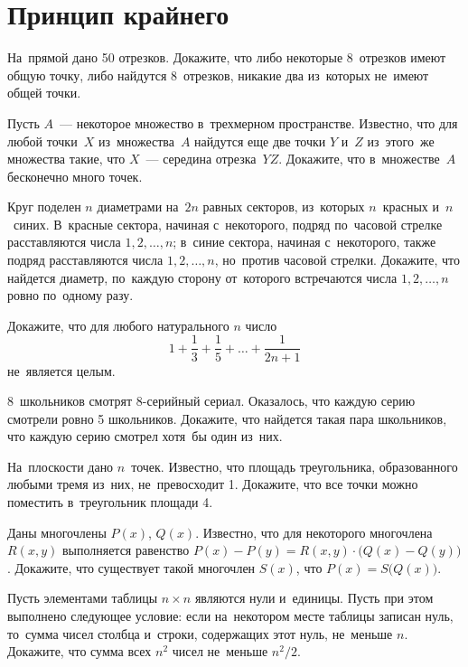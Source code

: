 
\section*{Принцип крайнего}


\begin{problems}

\item
На~прямой дано 50 отрезков.
Докажите, что либо некоторые 8~отрезков имеют общую точку, либо найдутся
8~отрезков, никакие два из~которых не~имеют общей точки.

\item
Пусть $A$~— некоторое множество в~трехмерном пространстве.
Известно, что для любой точки~$X$ из~множества~$A$ найдутся еще две точки
$Y$ и~$Z$ из~этого~же множества такие, что $X$~— середина отрезка~$YZ$.
Докажите, что в~множестве~$A$ бесконечно много точек.

\item
Круг поделен $n$ диаметрами на~$2 n$ равных секторов, из~которых $n$~красных
и~$n$~синих.
В~красные сектора, начиная с~некоторого, подряд по~часовой стрелке
расставляются числа $1, 2, \ldots, n$;
в~синие сектора, начиная с~некоторого, также подряд расставляются числа
$1, 2, \ldots, n$, но~против часовой стрелки.
Докажите, что найдется диаметр, по~каждую сторону от~которого встречаются числа
$1, 2, \ldots, n$ ровно по~одному разу.

\item
Докажите, что для любого натурального $n$ число
\[
    1 + \frac{1}{3} + \frac{1}{5} + \ldots + \frac{1}{2 n + 1}
\]
не~является целым.

\item
8~школьников смотрят 8-серийный сериал.
Оказалось, что каждую серию смотрели ровно 5 школьников.
Докажите, что найдется такая пара школьников, что каждую серию смотрел хотя~бы
один из~них.

\item
На~плоскости дано $n$~точек.
Известно, что площадь треугольника, образованного любыми тремя из~них,
не~превосходит 1.
Докажите, что все точки можно поместить в~треугольник площади 4.

\item
Даны многочлены $P(x)$, $Q(x)$.
Известно, что для некоторого многочлена $R(x, y)$ выполняется равенство
\(
    P(x) - P(y)
=
    R(x, y) \cdot \bigl( Q(x) - Q(y) \bigr)
\).
Докажите, что существует такой многочлен $S(x)$, что
$P(x) = S\bigl( Q(x) \bigr)$.

\item
Пусть элементами таблицы $n \times n$ являются нули и~единицы.
Пусть при этом выполнено следующее условие: если на~некотором месте таблицы
записан нуль, то~сумма чисел столбца и~строки, содержащих этот нуль,
не~меньше $n$.
Докажите, что сумма всех $n^2$ чисел не~меньше $n^2 / 2$.

\end{problems}

